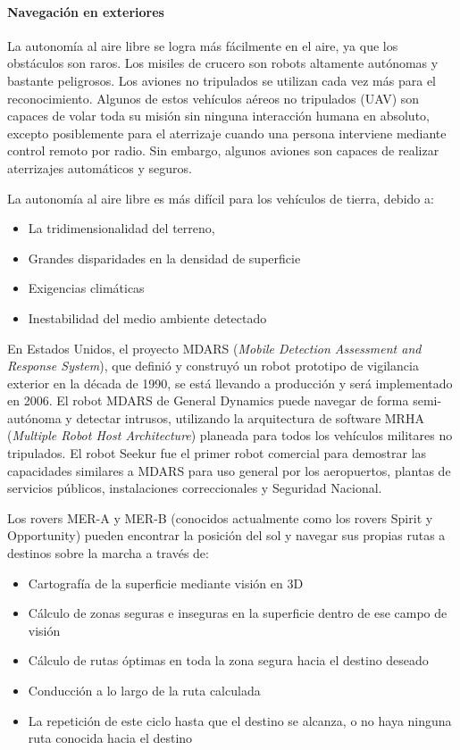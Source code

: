 \paragraph{Navegación en exteriores}
La autonomía al aire libre se logra más fácilmente en el aire, ya que los obstáculos son raros. Los misiles de crucero son robots altamente autónomas y bastante peligrosos. Los aviones no tripulados se utilizan cada vez más para el reconocimiento. Algunos de estos vehículos aéreos no tripulados (UAV) son capaces de volar toda su misión sin ninguna interacción humana en absoluto, excepto posiblemente para el aterrizaje cuando una persona interviene mediante control remoto por radio. Sin embargo, algunos aviones son capaces de realizar aterrizajes automáticos y seguros.

La autonomía al aire libre es más difícil para los vehículos de tierra, debido a:

\begin{itemize}
	\itemsep1pt \parskip1pt 
	\item La tridimensionalidad del terreno,
	\item Grandes disparidades en la densidad de superficie
	\item Exigencias climáticas
	\item Inestabilidad del medio ambiente detectado
\end{itemize}

En Estados Unidos, el proyecto MDARS (\textit{Mobile Detection Assessment and Response System}), que definió y construyó un robot prototipo de vigilancia exterior en la década de 1990, se está llevando a producción y será implementado en 2006. El robot MDARS de General Dynamics puede navegar de forma semi-autónoma y detectar intrusos, utilizando la arquitectura de software MRHA (\textit{Multiple Robot Host Architecture}) planeada para todos los vehículos militares no tripulados. El robot Seekur fue el primer robot comercial para demostrar las capacidades similares a MDARS para uso general por los aeropuertos, plantas de servicios públicos, instalaciones correccionales y Seguridad Nacional.

Los rovers MER-A y MER-B (conocidos actualmente como los rovers Spirit y Opportunity) pueden encontrar la posición del sol y navegar sus propias rutas a destinos sobre la marcha a través de:

\begin{itemize}
	\itemsep1pt \parskip1pt 
	\item Cartografía de la superficie mediante visión en 3D
	\item Cálculo de zonas seguras e inseguras en la superficie dentro de ese campo de visión
	\item Cálculo de rutas óptimas en toda la zona segura hacia el destino deseado
	\item Conducción a lo largo de la ruta calculada
	\item La repetición de este ciclo hasta que el destino se alcanza, o no haya ninguna ruta conocida hacia el destino
\end{itemize}

